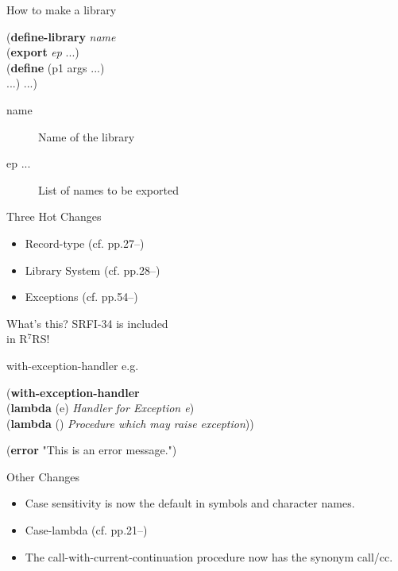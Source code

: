 \documentclass[dvipdfm,12pt,fleqn]{beamer}
\begin{document}
\begin{frame}{How to make a library}
\begin{screen}
(\textbf{define-library} \textit{name}\\
\hspace{1em}(\textbf{export} \textit{ep} ...)\\
\hspace{1em}(\textbf{define} (p1 args ...)\\
\hspace{2em}...) ...)\\
\end{screen}

\begin{description}
\item[name]Name of the library
\item[ep ...]List of names to be exported
\end{description}
\end{frame}

\begin{frame}{Three Hot Changes\footnotemark[1]}
\huge
\begin{itemize}
\item Record-type (cf. pp.27--)
\item Library System (cf. pp.28--)
\item \alert{Exceptions} (cf. pp.54--)
\end{itemize}
\end{frame}

\begin{frame}{What's this?}
\Huge
SRFI-34 is \alert{included}\\
in R$^7$RS!
\end{frame}

\begin{frame}{with-exception-handler}
e.g.
\begin{screen}
(\textbf{with-exception-handler}\\
\hspace{1em}(\textbf{lambda} (e) \textit{Handler for Exception e})\\
\hspace{1em}(\textbf{lambda} () \textit{Procedure which may raise exception}))
\end{screen}
\begin{screen}
(\textbf{error} "This is an error message.")
\end{screen}
\end{frame}

\begin{frame}{Other Changes}
\Large
\begin{itemize}
\pause\item Case sensitivity is now the default in symbols and character names.
\pause\item Case-lambda (cf. pp.21--)
\pause\item The call-with-current-continuation procedure now has the synonym call/cc.
\end{itemize}
\end{frame}
\end{document}
